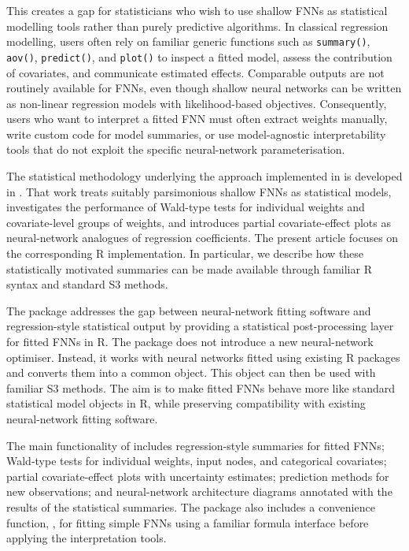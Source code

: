 This creates a gap for statisticians who wish to use shallow FNNs as statistical modelling tools rather than purely predictive algorithms.
In classical regression modelling, users often rely on familiar generic functions such as \texttt{summary()}, \texttt{aov()}, \texttt{predict()}, and \texttt{plot()} to inspect a fitted model, assess the contribution of covariates, and communicate estimated effects.
Comparable outputs are not routinely available for FNNs, even though shallow neural networks can be written as non-linear regression models with likelihood-based objectives.
Consequently, users who want to interpret a fitted FNN must often extract weights manually, write custom code for model summaries, or use model-agnostic interpretability tools that do not exploit the specific neural-network parameterisation.

The statistical methodology underlying the approach implemented in  is developed in \citet{mcinerney2023feedforward}.
That work treats suitably parsimonious shallow FNNs as statistical models, investigates the performance of Wald-type tests for individual weights and covariate-level groups of weights, and introduces partial covariate-effect plots as neural-network analogues of regression coefficients.
The present article focuses on the corresponding R implementation.
In particular, we describe how these statistically motivated summaries can be made available through familiar R syntax and standard S3 methods.

The  package addresses the gap between neural-network fitting software and regression-style statistical output by providing a statistical post-processing layer for fitted FNNs in R.
The package does not introduce a new neural-network optimiser.
Instead, it works with neural networks fitted using existing R packages and converts them into a common  object.
This object can then be used with familiar S3 methods.
The aim is to make fitted FNNs behave more like standard statistical model objects in R, while preserving compatibility with existing neural-network fitting software.

The main functionality of  includes regression-style summaries for fitted FNNs; Wald-type tests for individual weights, input nodes, and categorical covariates; partial covariate-effect plots with uncertainty estimates; prediction methods for new observations; and neural-network architecture diagrams annotated with the results of the statistical summaries.
The package also includes a convenience function, , for fitting simple FNNs using a familiar formula interface before applying the interpretation tools.

